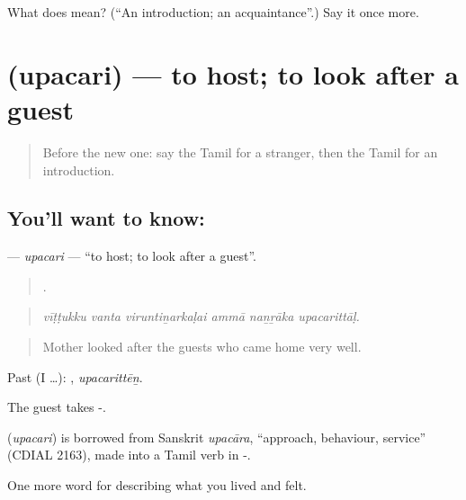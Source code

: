 \begin{tcolorbox}[breakable,colback=teal!4,colframe=teal!35!black,title={Before you move on}]
What does  mean? (\textquotedblleft{}An introduction; an acquaintance\textquotedblright{}.) Say it once more.
\end{tcolorbox}
\section[\texorpdfstring{\ta{உபசரி} (upacari)}{உபசரி (upacari)}]{ (upacari) — to host; to look after a guest}

\label{lesson:TA-C503-upacari}



\begin{quote}
Before the new one: say the Tamil for a stranger, then the Tamil for an introduction.
\end{quote}

\subsection*{You'll want to know: }
\textbf{} — \emph{upacari} — \textquotedblleft{}to host; to look after a guest\textquotedblright{}.

\begin{quote}
     .
\end{quote}

\begin{quote}
\emph{vīṭṭukku vanta viruntiṉarkaḷai ammā naṉṟāka upacarittāḷ.}
\end{quote}

\begin{quote}
Mother looked after the guests who came home very well.
\end{quote}

Past (I …): , \emph{upacarittēṉ}.

The guest takes -.

\begin{cousinweb}
\textbf{} (\emph{upacari}) is borrowed from Sanskrit \emph{upacāra}, \textquotedblleft{}approach, behaviour, service\textquotedblright{} (CDIAL 2163), made into a Tamil verb in -.
\end{cousinweb}

\begin{grammarlens}[title={What you've built}]
One more word for describing what you lived and felt.
\end{grammarlens}


